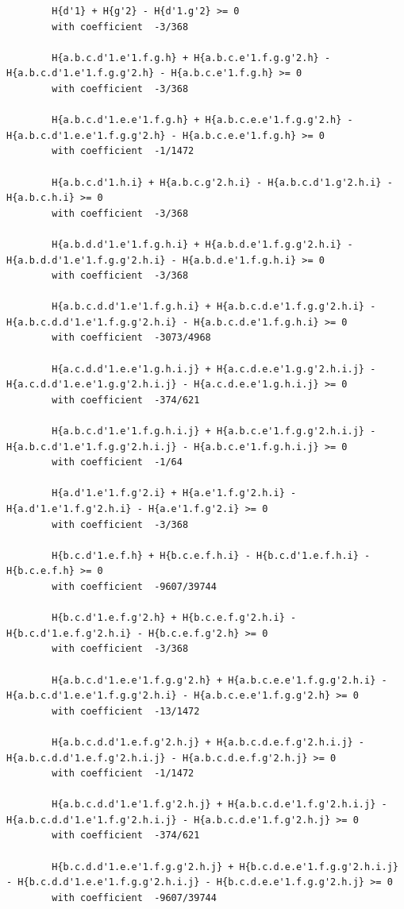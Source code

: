 \documentclass[11pt, a4paper]{kybernetika}
\begin{document}
\begin{verbatim}
		H{d'1} + H{g'2} - H{d'1.g'2} >= 0
		with coefficient  -3/368
		
		H{a.b.c.d'1.e'1.f.g.h} + H{a.b.c.e'1.f.g.g'2.h} - H{a.b.c.d'1.e'1.f.g.g'2.h} - H{a.b.c.e'1.f.g.h} >= 0
		with coefficient  -3/368
		
		H{a.b.c.d'1.e.e'1.f.g.h} + H{a.b.c.e.e'1.f.g.g'2.h} - H{a.b.c.d'1.e.e'1.f.g.g'2.h} - H{a.b.c.e.e'1.f.g.h} >= 0
		with coefficient  -1/1472
		
		H{a.b.c.d'1.h.i} + H{a.b.c.g'2.h.i} - H{a.b.c.d'1.g'2.h.i} - H{a.b.c.h.i} >= 0
		with coefficient  -3/368
		
		H{a.b.d.d'1.e'1.f.g.h.i} + H{a.b.d.e'1.f.g.g'2.h.i} - H{a.b.d.d'1.e'1.f.g.g'2.h.i} - H{a.b.d.e'1.f.g.h.i} >= 0
		with coefficient  -3/368
		
		H{a.b.c.d.d'1.e'1.f.g.h.i} + H{a.b.c.d.e'1.f.g.g'2.h.i} - H{a.b.c.d.d'1.e'1.f.g.g'2.h.i} - H{a.b.c.d.e'1.f.g.h.i} >= 0
		with coefficient  -3073/4968
		
		H{a.c.d.d'1.e.e'1.g.h.i.j} + H{a.c.d.e.e'1.g.g'2.h.i.j} - H{a.c.d.d'1.e.e'1.g.g'2.h.i.j} - H{a.c.d.e.e'1.g.h.i.j} >= 0
		with coefficient  -374/621
		
		H{a.b.c.d'1.e'1.f.g.h.i.j} + H{a.b.c.e'1.f.g.g'2.h.i.j} - H{a.b.c.d'1.e'1.f.g.g'2.h.i.j} - H{a.b.c.e'1.f.g.h.i.j} >= 0
		with coefficient  -1/64
		
		H{a.d'1.e'1.f.g'2.i} + H{a.e'1.f.g'2.h.i} - H{a.d'1.e'1.f.g'2.h.i} - H{a.e'1.f.g'2.i} >= 0
		with coefficient  -3/368
		
		H{b.c.d'1.e.f.h} + H{b.c.e.f.h.i} - H{b.c.d'1.e.f.h.i} - H{b.c.e.f.h} >= 0
		with coefficient  -9607/39744
		
		H{b.c.d'1.e.f.g'2.h} + H{b.c.e.f.g'2.h.i} - H{b.c.d'1.e.f.g'2.h.i} - H{b.c.e.f.g'2.h} >= 0
		with coefficient  -3/368
		
		H{a.b.c.d'1.e.e'1.f.g.g'2.h} + H{a.b.c.e.e'1.f.g.g'2.h.i} - H{a.b.c.d'1.e.e'1.f.g.g'2.h.i} - H{a.b.c.e.e'1.f.g.g'2.h} >= 0
		with coefficient  -13/1472
		
		H{a.b.c.d.d'1.e.f.g'2.h.j} + H{a.b.c.d.e.f.g'2.h.i.j} - H{a.b.c.d.d'1.e.f.g'2.h.i.j} - H{a.b.c.d.e.f.g'2.h.j} >= 0
		with coefficient  -1/1472
		
		H{a.b.c.d.d'1.e'1.f.g'2.h.j} + H{a.b.c.d.e'1.f.g'2.h.i.j} - H{a.b.c.d.d'1.e'1.f.g'2.h.i.j} - H{a.b.c.d.e'1.f.g'2.h.j} >= 0
		with coefficient  -374/621
		
		H{b.c.d.d'1.e.e'1.f.g.g'2.h.j} + H{b.c.d.e.e'1.f.g.g'2.h.i.j} - H{b.c.d.d'1.e.e'1.f.g.g'2.h.i.j} - H{b.c.d.e.e'1.f.g.g'2.h.j} >= 0
		with coefficient  -9607/39744
		

\end{verbatim}
\end{document}
